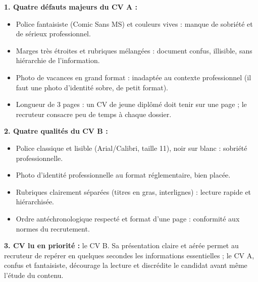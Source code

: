 \documentclass[11pt]{article}
\begin{document}
\begin{corrige}
\textbf{1. Quatre défauts majeurs du CV A :}
\begin{itemize}
\item Police fantaisiste (Comic Sans MS) et couleurs vives : manque de sobriété et de sérieux professionnel.
\item Marges très étroites et rubriques mélangées : document confus, illisible, sans hiérarchie de l'information.
\item Photo de vacances en grand format : inadaptée au contexte professionnel (il faut une photo d'identité sobre, de petit format).
\item Longueur de 3 pages : un CV de jeune diplômé doit tenir sur une page ; le recruteur consacre peu de temps à chaque dossier.
\end{itemize}
\textbf{2. Quatre qualités du CV B :}
\begin{itemize}
\item Police classique et lisible (Arial/Calibri, taille 11), noir sur blanc : sobriété professionnelle.
\item Photo d'identité professionnelle au format réglementaire, bien placée.
\item Rubriques clairement séparées (titres en gras, interlignes) : lecture rapide et hiérarchisée.
\item Ordre antéchronologique respecté et format d'une page : conformité aux normes du recrutement.
\end{itemize}
\textbf{3. CV lu en priorité :} le CV B. Sa présentation claire et aérée permet au recruteur de repérer en quelques secondes les informations essentielles ; le CV A, confus et fantaisiste, décourage la lecture et discrédite le candidat avant même l'étude du contenu.
\end{corrige}
\end{document}

